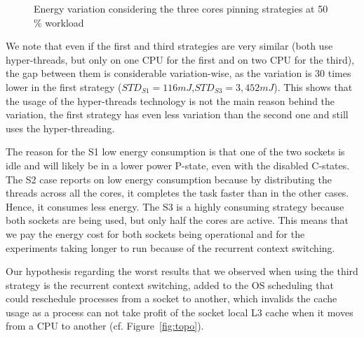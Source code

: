 \begin{figure}
    \caption{Energy variation considering the three cores pinning strategies at 50\,\% workload}\label{fig:cores-pinning}
\end{figure}

We note that even if the first and third strategies are very similar (both use hyper-threads, but only on one CPU for the first and on two CPU for the third), the gap between them is considerable variation-wise, as the variation is 30 times lower in the first strategy ($STD_{S1}=116 mJ$,$STD_{S3}=3,452 mJ$).
This shows that the usage of the hyper-threads technology is not the main reason behind the variation, the first strategy has even less variation than the second one and still uses the hyper-threading.

The reason for the \textsf{S1} low energy consumption is that one of the two sockets is idle and will likely be in a lower power P-state, even with the disabled C-states.
The \textsf{S2} case reports on low energy consumption because by distributing the threads across all the cores, it completes the task faster than in the other cases.
Hence, it consumes less energy.
The \textsf{S3} is a highly consuming strategy because both sockets are being used, but only half the cores are active.
This means that we pay the energy cost for both sockets being operational and for the experiments taking longer to run because of the recurrent context switching.

Our hypothesis regarding the worst results that we observed when using the third strategy is the recurrent context switching, added to the OS scheduling that could reschedule processes from a socket to another, which invalids the cache usage as a process can not take profit of the socket local L3 cache when it moves from a CPU to another (cf. Figure~\ref{fig:topo}).

